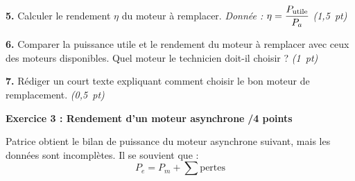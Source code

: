 \documentclass[11pt,a4paper]{article}
\newcommand{\cadreblanc}[1]{%
	\medskip\framebox[\linewidth][c]{%
		\rule{0mm}{#1mm}}\par
	\medskip}
\begin{document}
\textbf{5.} Calculer le rendement $\eta$ du moteur à remplacer.
\hfill \textit{Donnée : $\eta = \dfrac{P_{\rm utile}}{P_a}$}
\hfill \textit{(1,5~pt)}

\cadreblanc{18}

\textbf{6.} Comparer la puissance utile et le rendement du moteur à remplacer avec ceux des moteurs disponibles. Quel moteur le technicien doit-il choisir ? \hfill \textit{(1~pt)}

\cadreblanc{16}

\textbf{7.} Rédiger un court texte expliquant comment choisir le bon moteur de remplacement.
\hfill \textit{(0,5~pt)}

\cadreblanc{22}

\vfill

\textbf{Exercice 3 : Rendement d'un moteur asynchrone}
\hfill \textbf{/4 points}

\vspace{4mm}

Patrice obtient le bilan de puissance du moteur asynchrone suivant, mais les données sont incomplètes.
Il se souvient que :
\[P_e = P_m + \sum \text{pertes}\]
\end{document}
